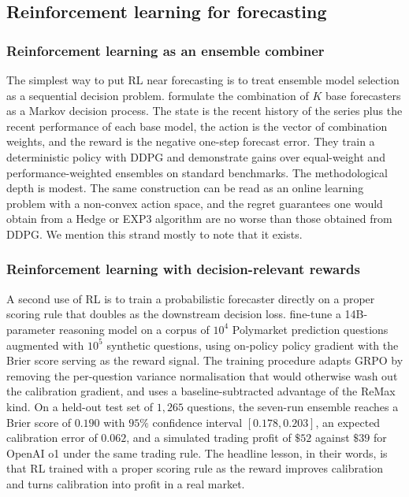 \subsection{Reinforcement learning for forecasting}
\label{sec:rl_for_forecasting}

\subsubsection{Reinforcement learning as an ensemble combiner}
\label{sec:rl_ensemble}

The simplest way to put RL near forecasting is to treat ensemble model selection as
a sequential decision problem. \citet{Fu2022} formulate the combination of $K$ base
forecasters as a Markov decision process. The state is the recent history of the
series plus the recent performance of each base model, the action is the vector of
combination weights, and the reward is the negative one-step forecast error. They
train a deterministic policy with DDPG and demonstrate gains over equal-weight and
performance-weighted ensembles on standard benchmarks. The methodological depth is
modest. The same construction can be read as an online learning problem with a
non-convex action space, and the regret guarantees one would obtain from a Hedge or
EXP3 algorithm are no worse than those obtained from DDPG. We mention this strand
mostly to note that it exists.

\subsubsection{Reinforcement learning with decision-relevant rewards}
\label{sec:rl_brier}

A second use of RL is to train a probabilistic forecaster directly on a proper
scoring rule that doubles as the downstream decision loss. \citet{Turtel2025} fine-tune
a 14B-parameter reasoning model on a corpus of $10^4$ Polymarket prediction questions
augmented with $10^5$ synthetic questions, using on-policy policy gradient with the
Brier score serving as the reward signal. The training procedure adapts GRPO by
removing the per-question variance normalisation that would otherwise wash out the
calibration gradient, and uses a baseline-subtracted advantage of the ReMax kind. On
a held-out test set of $1{,}265$ questions, the seven-run ensemble reaches a Brier
score of $0.190$ with $95\%$ confidence interval $[0.178, 0.203]$, an expected
calibration error of $0.062$, and a simulated trading profit of $\$52$ against $\$39$
for OpenAI o1 under the same trading rule. The headline lesson, in their words, is
that RL trained with a proper scoring rule as the reward improves calibration and
turns calibration into profit in a real market.

